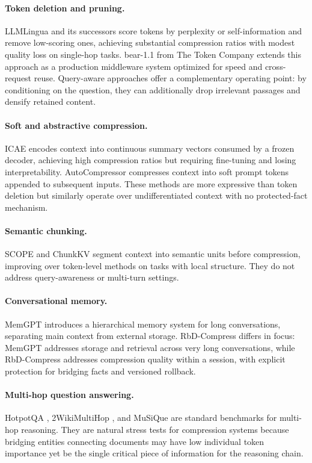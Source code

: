 \documentclass{article}
\begin{document}
\paragraph{Token deletion and pruning.}
LLMLingua \cite{jiang2023llmlingua} and its successors score tokens by
perplexity or self-information and remove low-scoring ones, achieving
substantial compression ratios with modest quality loss on single-hop
tasks. bear-1.1 from The Token Company extends this approach as a
production middleware system optimized for speed and cross-request reuse.
Query-aware approaches offer a complementary operating point: by
conditioning on the question, they can additionally drop irrelevant
passages and densify retained content.

\paragraph{Soft and abstractive compression.}
ICAE \cite{ge2023context} encodes context into continuous summary vectors
consumed by a frozen decoder, achieving high compression ratios but
requiring fine-tuning and losing interpretability. AutoCompressor
\cite{chevalier2023adapting} compresses context into soft prompt tokens
appended to subsequent inputs. These methods are more expressive than
token deletion but similarly operate over undifferentiated context with
no protected-fact mechanism.

\paragraph{Semantic chunking.}
SCOPE and ChunkKV segment context into semantic units before compression,
improving over token-level methods on tasks with local structure. They do
not address query-awareness or multi-turn settings.

\paragraph{Conversational memory.}
MemGPT \cite{packer2023memgpt} introduces a hierarchical memory system
for long conversations, separating main context from external storage.
RbD-Compress differs in focus: MemGPT addresses storage and retrieval
across very long conversations, while RbD-Compress addresses compression
quality within a session, with explicit protection for bridging facts and
versioned rollback.

\paragraph{Multi-hop question answering.}
HotpotQA \cite{yang2018hotpotqa}, 2WikiMultiHop \cite{ho2020constructing},
and MuSiQue \cite{trivedi2022musique} are standard benchmarks for
multi-hop reasoning. They are natural stress tests for compression systems
because bridging entities connecting documents may have low individual
token importance yet be the single critical piece of information for the
reasoning chain.
\end{document}
